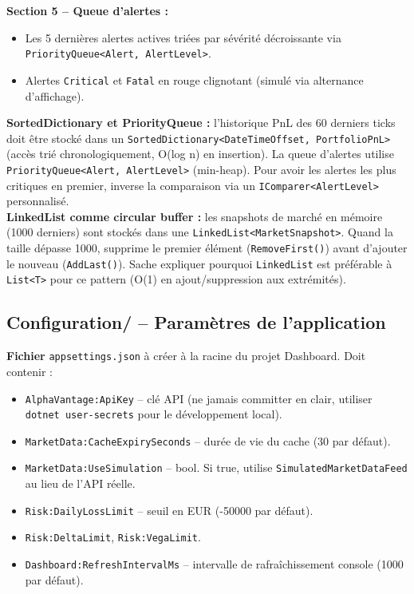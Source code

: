 \documentclass[a4paper,11pt]{article}
\newcommand{\cs}[1]{\texttt{\color{codeinline}#1}}
\begin{document}
\textbf{Section 5 -- Queue d'alertes :}
\begin{itemize}
  \item Les 5 dernières alertes actives triées par sévérité
        décroissante via \cs{PriorityQueue<Alert, AlertLevel>}.
  \item Alertes \cs{Critical} et \cs{Fatal} en rouge clignotant (simulé
        via alternance d'affichage).
\end{itemize}

\begin{tcolorbox}[constraint]
\textbf{SortedDictionary et PriorityQueue :} l'historique PnL des 60 derniers
ticks doit être stocké dans un
\cs{SortedDictionary<DateTimeOffset, PortfolioPnL>} (accès trié
chronologiquement, O(log n) en insertion). La queue d'alertes utilise
\cs{PriorityQueue<Alert, AlertLevel>} (min-heap). Pour avoir les alertes
les plus critiques en premier, inverse la comparaison via un
\cs{IComparer<AlertLevel>} personnalisé. \\[4pt]
\textbf{LinkedList comme circular buffer :} les snapshots de marché en
mémoire (1000 derniers) sont stockés dans une
\cs{LinkedList<MarketSnapshot>}. Quand la taille dépasse 1000,
supprime le premier élément (\cs{RemoveFirst()}) avant d'ajouter le
nouveau (\cs{AddLast()}). Sache expliquer pourquoi \cs{LinkedList} est
préférable à \cs{List<T>} pour ce pattern (O(1) en ajout/suppression
aux extrémités).
\end{tcolorbox}

\subsection{Configuration/ -- Paramètres de l'application}

\textbf{Fichier} \cs{appsettings.json} à créer à la racine du projet
Dashboard. Doit contenir :

\begin{itemize}
  \item \cs{AlphaVantage:ApiKey} -- clé API (ne jamais committer en clair,
        utiliser \cs{dotnet user-secrets} pour le développement local).
  \item \cs{MarketData:CacheExpirySeconds} -- durée de vie du cache (30 par
        défaut).
  \item \cs{MarketData:UseSimulation} -- bool. Si true, utilise
        \cs{SimulatedMarketDataFeed} au lieu de l'API réelle.
  \item \cs{Risk:DailyLossLimit} -- seuil en EUR (-50000 par défaut).
  \item \cs{Risk:DeltaLimit}, \cs{Risk:VegaLimit}.
  \item \cs{Dashboard:RefreshIntervalMs} -- intervalle de rafraîchissement
        console (1000 par défaut).
\end{itemize}
\end{document}
